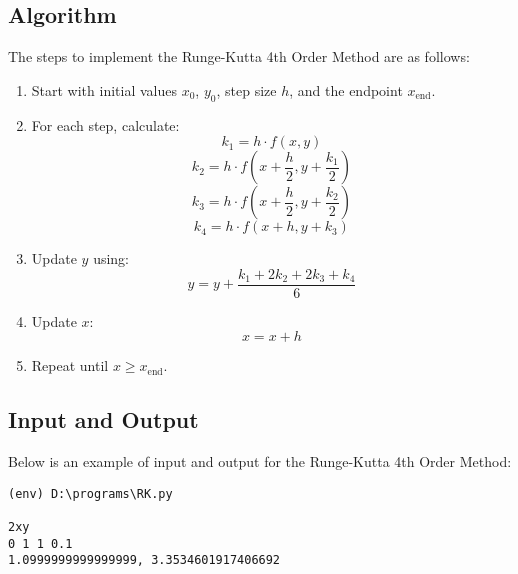 \documentclass[12pt]{article}
\begin{document}
\subsection*{Algorithm}
The steps to implement the Runge-Kutta 4th Order Method are as follows:
\begin{enumerate}
    \item Start with initial values \(x_0\), \(y_0\), step size \(h\), and the endpoint \(x_{\text{end}}\).
    \item For each step, calculate:
    \[
    k_1 = h \cdot f(x, y)
    \]
    \[
    k_2 = h \cdot f\left(x + \frac{h}{2}, y + \frac{k_1}{2}\right)
    \]
    \[
    k_3 = h \cdot f\left(x + \frac{h}{2}, y + \frac{k_2}{2}\right)
    \]
    \[
    k_4 = h \cdot f(x + h, y + k_3)
    \]
    \item Update \(y\) using:
    \[
    y = y + \frac{k_1 + 2k_2 + 2k_3 + k_4}{6}
    \]
    \item Update \(x\):
    \[
    x = x + h
    \]
    \item Repeat until \(x \geq x_{\text{end}}\).
\end{enumerate}

\subsection*{Input and Output}
\noindent Below is an example of input and output for the Runge-Kutta 4th Order Method:
{\small
\begin{verbatim}
(env) D:\programs\RK.py

2xy       
0 1 1 0.1
1.0999999999999999, 3.3534601917406692

\end{verbatim}
}

    
    
\end{document}
